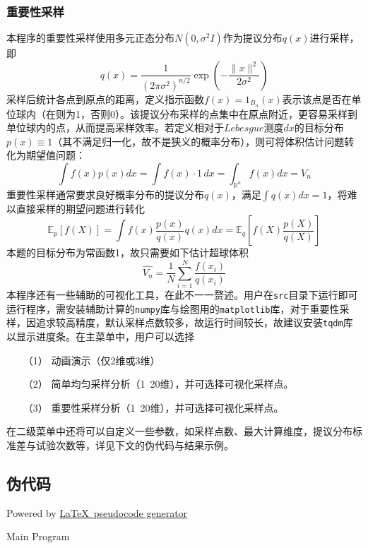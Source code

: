 \subsubsection{重要性采样}
本程序的重要性采样使用多元正态分布$N(0, \sigma^2 I)$作为提议分布$q(x)$进行采样，即
\[
    q(x) = \frac{1}{(2\pi \sigma^2)^{n/2}} \exp\left(-\frac{\|x\|^2}{2\sigma^2}\right)
\]
采样后统计各点到原点的距离，定义指示函数$ f(x) = 1_{B_n}(x) $表示该点是否在单位球内（在则为1，否则0）。该提议分布采样的点集中在原点附近，更容易采样到单位球内的点，从而提高采样效率。若定义相对于$Lebesgue$测度$dx$的目标分布$p(x) \equiv 1$（其不满足归一化，故不是狭义的概率分布），则可将体积估计问题转化为期望值问题：
\[
    \int f(x)p(x)dx = \int f(x)\cdot 1 \, dx = \int_{\mathbb{R}^n} f(x)dx = V_n
\]
重要性采样通常要求良好概率分布的提议分布$q(x)$，满足\(\int q(x)dx=1\)，将难以直接采样的期望问题进行转化
\[
    \mathbb{E}_p[f(X)] = \int f(x) \frac{p(x)}{q(x)} q(x) dx = \mathbb{E}_q\left[f(X)\frac{p(X)}{q(X)}\right]
\]
本题的目标分布为常函数1，故只需要如下估计超球体积
\[
    \hat{V_n} = \frac{1}{N}\sum_{i=1}^N \frac{f(x_i)}{q(x_i)}
\]
本程序还有一些辅助的可视化工具，在此不一一赘述。用户在\texttt{src}目录下运行即可运行程序，需安装辅助计算的\texttt{numpy}库与绘图用的\texttt{matplotlib}库，对于重要性采样，因追求较高精度，默认采样点数较多，故运行时间较长，故建议安装\texttt{tqdm}库以显示进度条。在主菜单中，用户可以选择
\begin{itemize}
    \item[（1）] 动画演示（仅2维或3维）
    \item[（2）] 简单均匀采样分析（1~20维），并可选择可视化采样点。
    \item[（3）] 重要性采样分析（1~20维），并可选择可视化采样点。
\end{itemize}
在二级菜单中还将可以自定义一些参数，如采样点数、最大计算维度，提议分布标准差与试验次数等，详见下文的伪代码与结果示例。
\subsection{伪代码}
Powered by \href{https://chatgpt.com/g/g-xJJAA2awf-latex-pseudocode-generator}{\LaTeX \ pseudocode generator}

\begin{algorithm}[H]
    \SetAlgoLined

    \;
    \caption{Main Program}
\end{algorithm}

